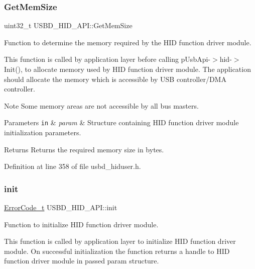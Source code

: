 \subsubsection{\texorpdfstring{Get\+Mem\+Size}{GetMemSize}}
{\footnotesize\ttfamily uint32\+\_\+t U\+S\+B\+D\+\_\+\+H\+I\+D\+\_\+\+A\+P\+I\+::\+Get\+Mem\+Size}

Function to determine the memory required by the H\+ID function driver module.

This function is called by application layer before calling p\+Usb\+Api-\/$>$hid-\/$>$Init(), to allocate memory used by H\+ID function driver module. The application should allocate the memory which is accessible by U\+SB controller/\+D\+MA controller. \begin{DoxyNote}{Note}
Some memory areas are not accessible by all bus masters.
\end{DoxyNote}

\begin{DoxyParams}[1]{Parameters}
\mbox{\tt in}  & {\em param} & Structure containing H\+ID function driver module initialization parameters. \\
\hline
\end{DoxyParams}
\begin{DoxyReturn}{Returns}
Returns the required memory size in bytes. 
\end{DoxyReturn}


Definition at line 358 of file usbd\+\_\+hiduser.\+h.

\mbox{\label{struct_u_s_b_d___h_i_d___a_p_i_a7b98c434713f1deb07abafcb52fae76d}} 
\subsubsection{\texorpdfstring{init}{init}}
{\footnotesize\ttfamily \hyperlink{error_8h_a905255056c349318139d94aa4523d516}{Error\+Code\+\_\+t} U\+S\+B\+D\+\_\+\+H\+I\+D\+\_\+\+A\+P\+I\+::init}

Function to initialize H\+ID function driver module.

This function is called by application layer to initialize H\+ID function driver module. On successful initialization the function returns a handle to H\+ID function driver module in passed param structure.


